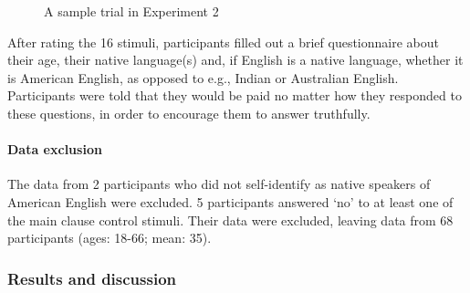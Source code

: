 \documentclass[11pt,fleqn]{article}
\newcommand{\6}{\mbox{$[\hspace*{-.6mm}[$}}
\newcommand{\9}{\mbox{$]\hspace*{-.6mm}]$}}
\begin{document}
\begin{figure}[H]
\centering


\caption{A sample trial in Experiment 2}\label{f-trial-exp2}
\end{figure}

After rating the 16 stimuli, participants filled out a brief questionnaire about their age, their native language(s) and, if English is a native language, whether it is
American English, as opposed to e.g., Indian or Australian English.
Participants were told that they would be paid no matter how they
responded to these questions, in order to encourage them to answer
truthfully.

\paragraph{Data exclusion} The data from 2 participants who did not self-identify as native speakers of American English were excluded. 5 participants answered `no' to at least one of the main clause control stimuli. Their data were excluded, leaving data from 68 participants (ages: 18-66; mean: 35).

\subsubsection{Results and discussion}
\end{document}
